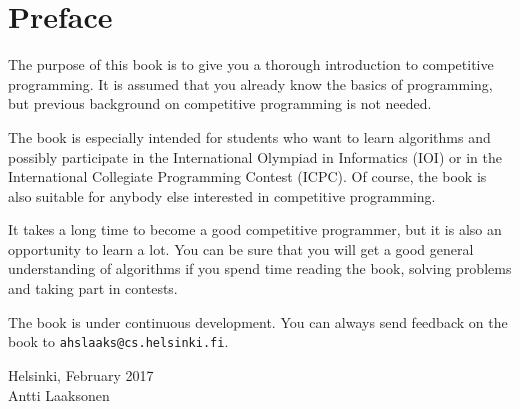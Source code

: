 \chapter*{Preface}

The purpose of this book is to give you
a thorough introduction to competitive programming.
It is assumed that you already
know the basics of programming, but previous
background on competitive programming is not needed.

The book is especially intended for
students who want to learn algorithms and
possibly participate in
the International Olympiad in Informatics (IOI) or
in the International Collegiate Programming Contest (ICPC).
Of course, the book is also suitable for 
anybody else interested in competitive programming.

It takes a long time to become a good competitive
programmer, but it is also an opportunity to learn a lot.
You can be sure that you will get
a good general understanding of algorithms
if you spend time reading the book,
solving problems and taking part in contests.

The book is under continuous development.
You can always send feedback on the book to
\texttt{ahslaaks@cs.helsinki.fi}.

\begin{flushright}
Helsinki, February 2017 \\
Antti Laaksonen
\end{flushright}
